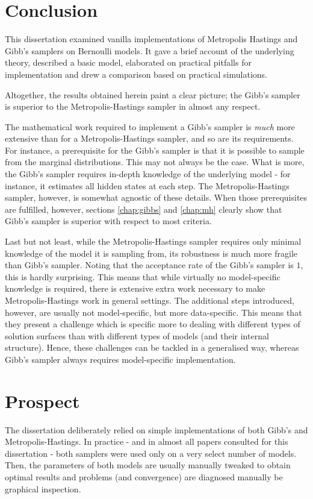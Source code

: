 \section{Conclusion}
This dissertation examined vanilla implementations of Metropolis Hastings and Gibb's samplers on Bernoulli models. It gave a brief account of the underlying theory, described a basic model,  elaborated on practical pitfalls for implementation and drew a comparison based on practical simulations. 

Altogether, the results obtained herein paint a clear picture; the Gibb's sampler is superior to the Metropolis-Hastings sampler in almost any respect. 

The mathematical work required to implement a Gibb's sampler is \textit{much} more extensive than for a Metropolis-Hastings sampler, and so are its requirements. For instance, a prerequisite for the Gibb's sampler is that it is possible to sample from the marginal distributions. This may not always be the case. What is more, the Gibb's sampler requires in-depth knowledge of the underlying model - for instance, it estimates all hidden states at each step. The Metropolis-Hastings sampler, however,  is somewhat agnostic of these details.  When those prerequisites are fulfilled, however, sections \ref{chap:gibbs} and \ref{chap:mh} clearly show that Gibb's sampler is superior with respect to most criteria. 

Last but not least, while the Metropolis-Hastings sampler requires only minimal knowledge of the model it is sampling from, its robustness is much more fragile than Gibb's sampler. Noting that the acceptance rate of the Gibb's sampler is $1$, this is hardly surprising. This means that while virtually no model-specific knowledge is required, there is extensive extra work necessary to make Metropolis-Hastings work in general settings. The additional steps introduced, however, are usually not model-specific, but more data-specific. This means that they present a challenge which is specific more to dealing with different types of solution surfaces than with different types of models (and their internal structure). Hence, these challenges can be tackled in a generalised way, whereas Gibb's sampler always requires model-specific implementation. 


\section{Prospect}
The dissertation deliberately relied on simple implementations of both Gibb's and Metropolis-Hastings. In practice - and in almost all papers consulted for this dissertation - both samplers were used only on a very select number of models. Then, the parameters of both models are usually manually tweaked to obtain optimal results and problems (and convergence) are diagnosed manually be graphical inspection. 

